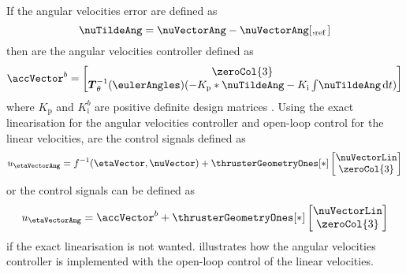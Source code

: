 If the angular velocities error are defined as 
\begin{equation}
\nuTildeAng = \nuVectorAng - \nuVectorAng[,_{\text{ref}}]
\end{equation}
then are the \abbrPI angular velocities controller defined as 
\begin{equation}
	\accVector^b = \begin{bmatrix} 
	\zeroCol{3} \\
	\boldsymbol{T}^{-1}_\theta(\eulerAngles)(-K_{\text{p}}*\nuTildeAng - K_{\text{i}}\int \! \nuTildeAng \, \mathrm{d}t)
	\end{bmatrix}
\end{equation}
where $K_{\text{p}}$ and $K_{\text{i}}^b$ are positive definite design matrices \citep[p. 453]{fossen2011}.
Using the exact linearisation for the angular velocities controller and open-loop control for the linear velocities, are the control signals defined as
\begin{equation}
	u_{\etaVectorAng} = f^{-1}(\etaVector,\nuVector) + \thrusterGeometryOnes[*] \begin{bmatrix} \nuVectorLin \\ \zeroCol{3} \end{bmatrix}	
\end{equation}
or the control signals can be defined as 
\begin{equation}
	u_{\etaVectorAng} = \accVector^b + \thrusterGeometryOnes[*] \begin{bmatrix} \nuVectorLin \\ \zeroCol{3} \end{bmatrix}
\end{equation}
if the exact linearisation is not wanted.  illustrates how the angular velocities controller is implemented with the open-loop control of the linear velocities.
